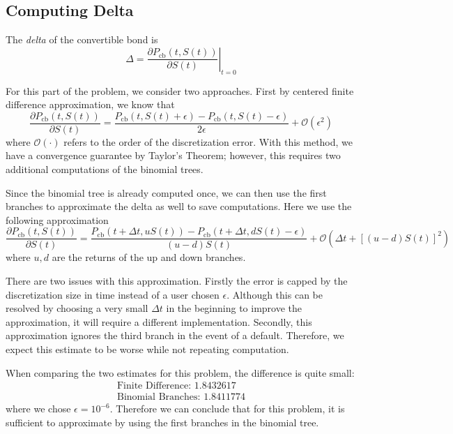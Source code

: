 \documentclass[11pt]{article}
\theoremstyle{definition}
\begin{document}
\subsection{Computing Delta}

The \emph{delta} of the convertible bond is 
%
\begin{equation*}
  \Delta = \left. \frac{\partial P_\text{cb}(t,S(t)) }{\partial S(t)}
  \right|_{t=0}
\end{equation*}

For this part of the problem, we consider two approaches. 
First by centered finite difference approximation, 
we know that
%
\begin{equation} \label{cfd}
  \frac{\partial P_\text{cb}(t,S(t)) }{\partial S(t)}
  = \frac{P_\text{cb}(t,S(t) + \epsilon) - 
          P_\text{cb}(t,S(t)-\epsilon)}{2\epsilon}
    + \mathcal{O}(\epsilon ^ 2)
\end{equation}
%
where $\mathcal{O}(\cdot)$ refers to the order of 
the discretization error.
With this method, we have a 
convergence guarantee by Taylor's Theorem;
however, this requires two additional computations 
of the binomial trees.

Since the binomial tree is already computed once,
we can then use the first branches to approximate the delta as well
to save computations. Here we use the following approximation
%
\begin{equation} \label{bino_cfd}
  \frac{\partial P_\text{cb}(t,S(t)) }{\partial S(t)}
  = \frac{P_\text{cb}(t + \Delta t, u S(t) ) - 
        P_\text{cb}(t + \Delta t, d S(t)-\epsilon)}{
        (u-d)S(t)}
    + \mathcal{O}\left(\Delta t + [(u-d)S(t)]^2\right)
\end{equation}
%
where $u,d$ are the returns of the up and down branches.

There are two issues with this approximation.
Firstly the error is capped by the discretization size in time
instead of a user chosen $\epsilon$.
Although this can be resolved by choosing a very small 
$\Delta t$ in the beginning to improve the approximation,
it will require a different implementation.
Secondly, this approximation ignores the third branch 
in the event of a default.
Therefore, we expect this estimate to be worse
while not repeating computation.

When comparing the two estimates for this problem, 
the difference is quite small:
%
\begin{equation*}
\begin{aligned}
  \text{Finite Difference: } 1.8432617 \\
  \text{Binomial Branches: } 1.8411774
\end{aligned}
\end{equation*}
%
where we chose $\epsilon = 10^{-6}$. 
Therefore we can conclude that for this problem, 
it is sufficient to approximate by 
using the first branches in the binomial tree.
\end{document}
